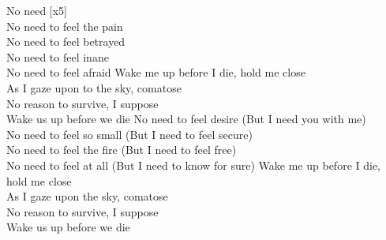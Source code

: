 
No need [x5]\\
No need to feel the pain\\
No need to feel betrayed\\
No need to feel inane\\
No need to feel afraid
\hops
{} Wake me up before I die, hold me close\\
 As I gaze upon to the sky, comatose\\
 No reason to survive, I suppose\\
 Wake us up before we die
\hops
No need to feel desire (But I need you with me)\\
No need to feel so small (But I need to feel secure)\\
No need to feel the fire (But I need to feel free)\\
No need to feel at all (But I need to know for sure)
\hops
{} Wake me up before I die, hold me close\\
 As I gaze upon the sky, comatose\\
 No reason to survive, I suppose\\
 Wake us up before we die

\clearpage
{}

